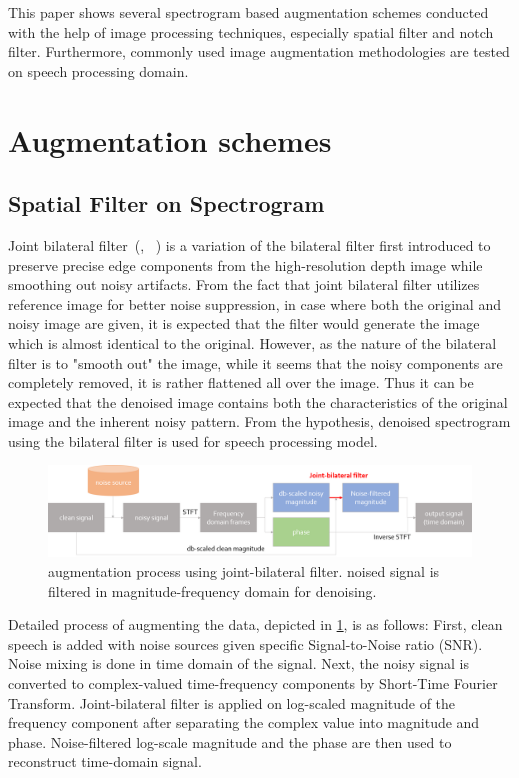 \documentclass[10pt,twocolumn,letterpaper]{article}
\begin{document}
This paper shows several spectrogram based augmentation schemes conducted with the help of image processing techniques,
especially spatial filter and notch filter. Furthermore, commonly used image augmentation methodologies
are tested on speech processing domain.

\section{Augmentation schemes}
\subsection{Spatial Filter on Spectrogram}
\label{sec:spatial}

Joint bilateral filter~(\cite{eisemann2004flash}, ~\cite{petschnigg2004digital}) is a variation of the 
bilateral filter first introduced to preserve precise edge components from the high-resolution depth 
image while smoothing out noisy artifacts. From the fact that joint bilateral filter utilizes reference 
image for better noise suppression, in case where both the original and noisy image are given, it is expected
that the filter would generate the image which is almost identical to the original. However, as the nature of 
the bilateral filter is to "smooth out" the image, while it seems that the noisy components are completely removed,
it is rather flattened all over the image. Thus it can be expected that the denoised image contains both the 
characteristics of the original image and the inherent noisy pattern. From the hypothesis, denoised spectrogram
using the bilateral filter is used for speech processing model.

\begin{figure}[h]
   \centering
   \includegraphics[width=\linewidth]{jbfilter_process}
   \caption{augmentation process using joint-bilateral filter. noised signal is filtered in 
   magnitude-frequency domain for denoising.}
   \label{fig:jbfilter_process}
\end{figure}

Detailed process of augmenting the data, depicted in \cref{fig:jbfilter_process}, is as follows: 
First, clean speech is added with noise sources given specific Signal-to-Noise ratio (SNR).
Noise mixing is done in time domain of the signal. Next, the noisy signal is converted to complex-valued
time-frequency components by Short-Time Fourier Transform. Joint-bilateral filter is applied on log-scaled
magnitude of the frequency component after separating the complex value into magnitude and phase.
Noise-filtered log-scale magnitude and the phase are then used to reconstruct time-domain signal. 
\end{document}
